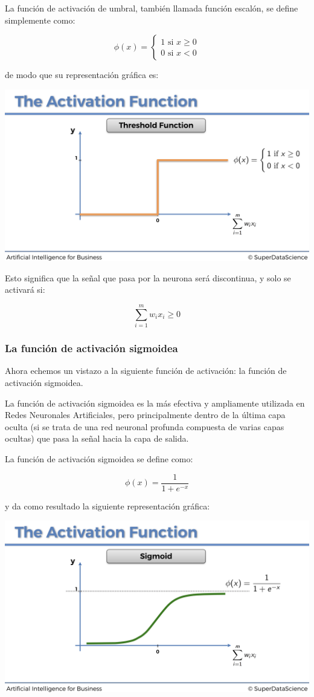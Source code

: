 \documentclass[]{book}
\begin{document}
La función de activación de umbral, también llamada función escalón, se define simplemente como:

\[
\phi(x) =
    \begin{cases}
        1 \textrm{ si } x \ge 0 \\
        0 \textrm{ si } x < 0
    \end{cases}
\]

de modo que su representación gráfica es:

\includegraphics{Images/ANN_10.png}

Esto significa que la señal que pasa por la neurona será discontinua, y solo se activará si:

\[\sum_{i=1}^m w_i x_i \ge 0\]

\hypertarget{la-funciuxf3n-de-activaciuxf3n-sigmoidea}{%
\subsubsection{La función de activación sigmoidea}\label{la-funciuxf3n-de-activaciuxf3n-sigmoidea}}

Ahora echemos un vistazo a la siguiente función de activación: la función de activación sigmoidea.

La función de activación sigmoidea es la más efectiva y ampliamente utilizada en Redes Neuronales Artificiales, pero principalmente dentro de la última capa oculta (si se trata de una red neuronal profunda compuesta de varias capas ocultas) que pasa la señal hacia la capa de salida.

La función de activación sigmoidea se define como:

\[\phi(x) = \frac{1}{1+e^{-x}}\]

y da como resultado la siguiente representación gráfica:

\includegraphics{Images/ANN_11.png}
\end{document}

